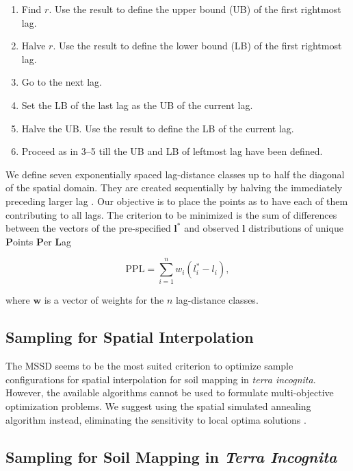 \begin{enumerate}
 \item Find $r$. Use the result to define the upper bound (UB) of the first rightmost lag.
 \item Halve $r$. Use the result to define the lower bound (LB) of the first rightmost lag.
 \item Go to the next lag.
 \item Set the LB of the last lag as the UB of the current lag.
 \item Halve the UB. Use the result to define the LB of the current lag.
 \item Proceed as in 3--5 till the UB and LB of leftmost lag have been defined.
\end{enumerate}


We define seven exponentially spaced lag-distance classes up to half the 
diagonal of the spatial domain. They are created sequentially by halving the immediately preceding larger lag 
\cite{TruongEtAl2013}. Our objective is to place the points as to have each of them contributing to all lags. 
The criterion to be minimized is the sum of differences between the vectors of the pre-specified 
$\boldsymbol{l}^*$ and observed $\boldsymbol{l}$ distributions of unique \textbf{P}oints \textbf{P}er 
\textbf{L}ag

\begin{equation}
 \text{PPL} = \sum_{i = 1}^{n} w_i (l_i^* - l_i),
\end{equation}\label{eq:chap08-ppl}

\noindent where $\boldsymbol{w}$ is a vector of weights for the $n$ lag-distance classes.

\subsection{Sampling for Spatial Interpolation}

The MSSD seems to be the most suited criterion to optimize sample configurations for spatial interpolation for 
soil mapping in \emph{terra incognita}. However, the available algorithms cannot be used to formulate 
multi-objective optimization problems. We suggest using the spatial simulated annealing algorithm instead, 
eliminating the sensitivity to local optima solutions \cite{KirkpatrickEtAl1983, Groenigen1999a}.

\subsection{Sampling for Soil Mapping in \emph{Terra Incognita}}

